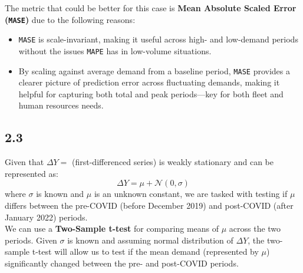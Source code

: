 The metric that could be better for this case is \textbf{Mean Absolute Scaled
	Error (\texttt{MASE})} due to the following reasons:
\begin{itemize}
	\item \texttt{MASE} is scale-invariant, making it useful across high- and
	      low-demand periods without the issues \texttt{MAPE} has in low-volume
	      situations.
	\item By scaling against average demand from a baseline period, \texttt{MASE}
	      provides a clearer picture of prediction error across fluctuating
	      demands, making it helpful for capturing both total and peak
	      periods—key for both fleet and human resources needs.
\end{itemize}

\subsection{2.3}
Given that $\Delta Y= $ (first-differenced series) is weakly stationary and can
be represented as:
\begin{equation}
	\Delta Y = \mu + \mathcal{N}(0,\sigma)
\end{equation}
where $\sigma$ is known and $\mu$ is an unknown constant, we are tasked with
testing if $\mu$ differs between the pre-COVID (before December 2019) and
post-COVID (after January 2022) periods.
\\
We can use a \textbf{Two-Sample t-test} for comparing means of $\mu$ across the
two periods. Given $\sigma$ is known and assuming normal distribution of
$\Delta Y$, the two-sample t-test will allow us to test if the mean demand
(represented by $\mu$) significantly changed between the pre- and post-COVID
periods.

